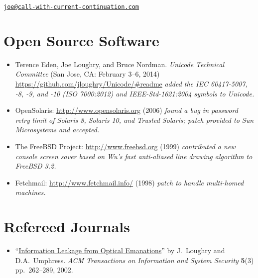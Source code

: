 \documentclass[12pt,twoside,letterpaper]{article}
\begin{document}
\newpage


\vspace*{-18mm}\hfill\href{mailto:joe@call-with-current-continuation.com}%
{\nolinkurl{joe@call-with-current-continuation.com}}

\vspace{-9mm}
\section*{Open Source Software}
\vspace{-2mm}
\begin{itemize}
	\item Terence Eden, Joe Loughry, and Bruce Nordman. \emph{Unicode
		Technical Committee} (San Jose, CA: February 3--6, 2014)
		\url{https://github.com/jloughry/Unicode/#readme} \emph{added
		the IEC 60417-5007, -8, -9, and -10 (ISO 7000:2012) and
		IEEE-Std-1621:2004 symbols to Unicode.}\vspace{-1mm}
	\item OpenSolaris: \url{http://www.opensolaris.org} (2006)
		\emph{found a bug in password retry limit of Solaris 8, Solaris 10,
		and Trusted Solaris; patch provided to Sun Microsystems and accepted.}\vspace{-1mm}
	\item The FreeBSD Project: \url{http://www.freebsd.org} (1999)
		\emph{contributed a new console screen saver based on Wu's fast
		anti-aliased line drawing algorithm to FreeBSD 3.2.}\vspace{-1mm}
	\item Fetchmail: \url{http://www.fetchmail.info/} (1998)
		\emph{patch to handle multi-homed machines.}
\end{itemize}

\vspace{-8mm}
\section*{Refereed Journals}
\vspace{-2mm}
\begin{itemize}
	\item ``\href{http://dl.acm.org/citation.cfm?doid=545186.545189}{Information
		Leakage from Optical Emanations}'' by J.\ Loughry and D.A.\ Umphress.
		\emph{ACM Transactions on Information and System Security} \textbf{5}(3)
		pp.\ 262--289, 2002.
\end{itemize}

\vspace{-8mm}
\end{document}
